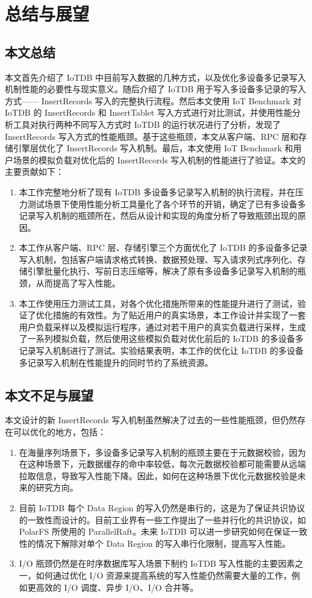 
\chapter{总结与展望}
\section{本文总结}
本文首先介绍了 IoTDB 中目前写入数据的几种方式，以及优化多设备多记录写入机制性能的必要性与现实意义。随后介绍了 IoTDB 用于写入多设备多记录的写入方式—— InsertRecords 写入的完整执行流程。然后本文使用 IoT Benchmark 对 IoTDB 的 InsertRecords 和 InsertTablet 写入方式进行对比测试，并使用性能分析工具对执行两种不同写入方式时 IoTDB 的运行状况进行了分析，发现了 InsertRecords 写入方式的性能瓶颈。基于这些瓶颈，本文从客户端、RPC 层和存储引擎层优化了 InsertRecords 写入机制。最后，本文使用 IoT Benchmark 和用户场景的模拟负载对优化后的 InsertRecords 写入机制的性能进行了验证。本文的主要贡献如下：
\begin{enumerate}
  \item 本工作完整地分析了现有 IoTDB 多设备多记录写入机制的执行流程，并在压力测试场景下使用性能分析工具量化了各个环节的开销，确定了已有多设备多记录写入机制的瓶颈所在，然后从设计和实现的角度分析了导致瓶颈出现的原因。
  \item 本工作从客户端、RPC 层、存储引擎三个方面优化了 IoTDB 的多设备多记录写入机制，包括客户端请求格式转换、数据预处理、写入请求列式序列化、存储引擎批量化执行、写前日志压缩等，解决了原有多设备多记录写入机制的瓶颈，从而提高了写入性能。
  \item 本工作使用压力测试工具，对各个优化措施所带来的性能提升进行了测试，验证了优化措施的有效性。为了贴近用户的真实场景，本工作设计并实现了一套用户负载采样以及模拟运行程序，通过对若干用户的真实负载进行采样，生成了一系列模拟负载，然后使用这些模拟负载对优化前后的 IoTDB 的多设备多记录写入机制进行了测试。实验结果表明，本工作的优化让 IoTDB 的多设备多记录写入机制在性能提升的同时节约了系统资源。
\end{enumerate}
\section{本文不足与展望}
本文设计的新 InsertRecords 写入机制虽然解决了过去的一些性能瓶颈，但仍然存在可以优化的地方，包括：
\begin{enumerate}
  \item 在海量序列场景下，多设备多记录写入机制的瓶颈主要在于元数据校验，因为在这种场景下，元数据缓存的命中率较低，每次元数据校验都可能需要从远端拉取信息，导致写入性能下降。因此，如何在这种场景下优化元数据校验是未来的研究方向。
  \item 目前 IoTDB 每个 Data Region 的写入仍然是串行的，这是为了保证共识协议的一致性而设计的。目前工业界有一些工作提出了一些并行化的共识协议，如 PolarFS 所使用的 ParallelRaft\cite{cao2018polarfs}。未来 IoTDB 可以进一步研究如何在保证一致性的情况下解除对单个 Data Region 的写入串行化限制，提高写入性能。
  \item I/O 瓶颈仍然是在时序数据库写入场景下制约 IoTDB 写入性能的主要因素之一，如何通过优化 I/O 资源来提高系统的写入性能仍然需要大量的工作，例如更高效的 I/O 调度、异步 I/O、I/O 合并等。
\end{enumerate}
